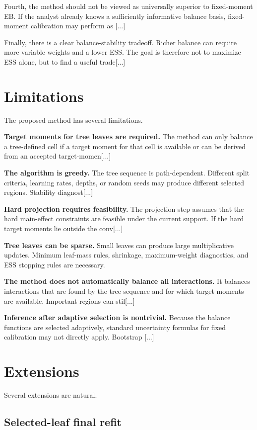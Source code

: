 \documentclass[11pt]{article}
\begin{document}
{Fourth, the method should not be viewed as universally superior to fixed-moment EB. If the analyst already knows a sufficiently informative balance basis, fixed-moment calibration may perform as [...]

Finally, there is a clear balance-stability tradeoff. Richer balance can require more variable weights and a lower ESS. The goal is therefore not to maximize ESS alone, but to find a useful trade[...] 

\section{Limitations}

The proposed method has several limitations.

\textbf{Target moments for tree leaves are required.} The method can only balance a tree-defined cell if a target moment for that cell is available or can be derived from an accepted target-momen[...]

\textbf{The algorithm is greedy.} The tree sequence is path-dependent. Different split criteria, learning rates, depths, or random seeds may produce different selected regions. Stability diagnost[...]

\textbf{Hard projection requires feasibility.} The projection step assumes that the hard main-effect constraints are feasible under the current support. If the hard target moments lie outside the conv[...] 

\textbf{Tree leaves can be sparse.} Small leaves can produce large multiplicative updates. Minimum leaf-mass rules, shrinkage, maximum-weight diagnostics, and ESS stopping rules are necessary.

\textbf{The method does not automatically balance all interactions.} It balances interactions that are found by the tree sequence and for which target moments are available. Important regions can stil[...] 

\textbf{Inference after adaptive selection is nontrivial.} Because the balance functions are selected adaptively, standard uncertainty formulas for fixed calibration may not directly apply. Bootstrap [...]

\section{Extensions}

Several extensions are natural.

\subsection{Selected-leaf final refit}

}
\end{document}

